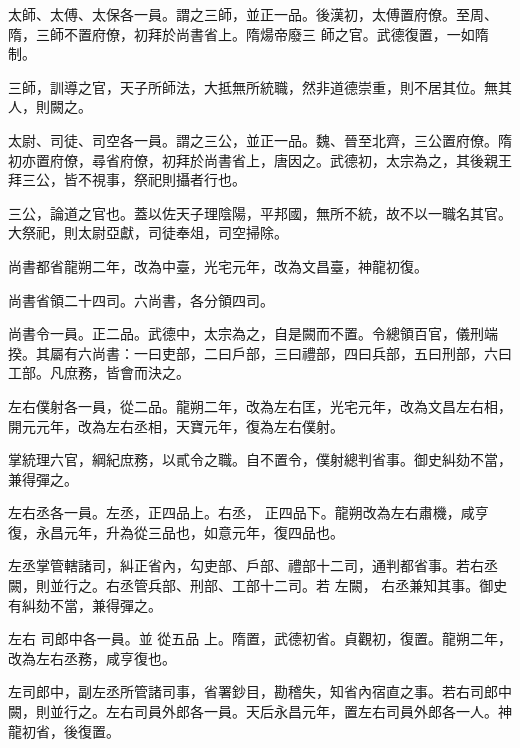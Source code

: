 
\begin{pinyinscope}

 太師、太傅、太保各一員。謂之三師，並正一品。後漢初，太傅置府僚。至周、隋，三師不置府僚，初拜於尚書省上。隋煬帝廢三
 師之官。武德復置，一如隋制。



 三師，訓導之官，天子所師法，大抵無所統職，然非道德崇重，則不居其位。無其人，則闕之。



 太尉、司徒、司空各一員。謂之三公，並正一品。魏、晉至北齊，三公置府僚。隋初亦置府僚，尋省府僚，初拜於尚書省上，唐因之。武德初，太宗為之，其後親王拜三公，皆不視事，祭祀則攝者行也。



 三公，論道之官也。蓋以佐天子理陰陽，平邦國，無所不統，故不以一職名其官。大祭祀，則太尉亞獻，司徒奉俎，司空掃除。



 尚書都省龍朔二年，改為中臺，光宅元年，改為文昌臺，神龍初復。



 尚書省領二十四司。六尚書，各分領四司。



 尚書令一員。正二品。武德中，太宗為之，自是闕而不置。令總領百官，儀刑端揆。其屬有六尚書：一曰吏部，二曰戶部，三曰禮部，四曰兵部，五曰刑部，六曰工部。凡庶務，皆會而決之。



 左右僕射各一員，從二品。龍朔二年，改為左右匡，光宅元年，改為文昌左右相，開元元年，改為左右丞相，天寶元年，復為左右僕射。



 掌統理六官，綱紀庶務，以貳令之職。自不置令，僕射總判省事。御史糾劾不當，兼得彈之。



 左右丞各一員。左丞，正四品上。右丞，
 正四品下。龍朔改為左右肅機，咸亨復，永昌元年，升為從三品也，如意元年，復四品也。



 左丞掌管轄諸司，糾正省內，勾吏部、戶部、禮部十二司，通判都省事。若右丞闕，則並行之。右丞管兵部、刑部、工部十二司。若
 左闕，
 右丞兼知其事。御史有糾劾不當，兼得彈之。



 左右
 司郎中各一員。並
 從五品
 上。隋置，武德初省。貞觀初，復置。龍朔二年，改為左右丞務，咸亨復也。



 左司郎中，副左丞所管諸司事，省署鈔目，勘稽失，知省內宿直之事。若右司郎中闕，則並行之。左右司員外郎各一員。天后永昌元年，置左右司員外郎各一人。神龍初省，後復置。




\end{pinyinscope}
